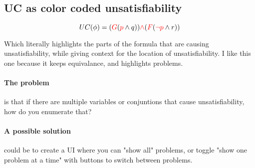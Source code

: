 \documentclass{article}
\begin{document}
\subsection*{UC as color coded unsatisfiability}
\[UC(\phi) = (\textcolor{red}{G}(\textcolor{red}{p} \wedge q)) \textcolor{red}{\wedge} (\textcolor{red}{F}(\textcolor{red}{\neg p} \wedge r))\]

Which literally highlights the parts of the formula that are causing unsatisfiability, while giving context for the location of unsatisfiability. I like this one because it keeps equivalance, and highlights problems.

\paragraph{The problem} is that if there are multiple variables or conjuntions that cause unsatisfiability, how do you enumerate that?

\paragraph{A possible solution} could be to create a UI where you can "show all" problems, or toggle "show one problem at a time" with buttons to switch between problems.
\end{document}
